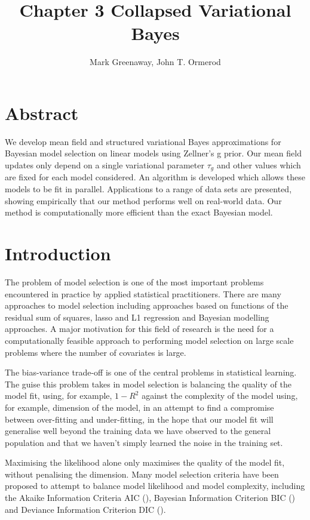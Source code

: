 \documentclass{amsart}[12pt]
\title{Chapter 3 Collapsed Variational Bayes}
\author{Mark Greenaway, John T. Ormerod}
\begin{document}
\maketitle

\section*{Abstract}


We develop mean field and structured variational Bayes approximations for Bayesian model selection on linear
models using Zellner's g prior. Our mean field updates only depend on a single variational parameter $\tau_g$
and other values which are fixed for each model considered. An algorithm is developed which allows these
models to be fit in parallel. Applications to a range of data sets are presented, showing  empirically that
our method performs well on real-world data. Our method is computationally more efficient  than the exact
Bayesian model.

\section{Introduction}

The problem of model selection is one of the most important problems encountered in practice by applied
statistical practitioners. There are many approaches to model selection including approaches based on
functions of the residual sum of squares, lasso and L1 regression and Bayesian modelling approaches. A major
motivation for this field of research is the need for a computationally feasible approach to performing model
selection on large scale problems where the number of covariates is large.

The bias-variance trade-off is one of the central problems in statistical learning. The guise this problem
takes in model selection is balancing the quality of the model fit, using, for example, $1 - R^2$ against the
complexity of the model using, for example, dimension of the model, in an attempt to find a compromise between
over-fitting and under-fitting, in the hope that our model fit will generalise well beyond the training data
we have observed to the general population and that we haven't simply learned the noise in the training set.

Maximising the likelihood alone only maximises the quality of the model fit, without penalising the dimension.
Many model selection criteria have been proposed to attempt to balance model likelihood and model complexity,
including the Akaike Information Criteria AIC (\cite{DeLeeuw1992}), Bayesian Information Criterion BIC
(\cite{Schwarz1978}) and Deviance Information Criterion DIC (\cite{Spiegelhalter2016}).
\end{document}
